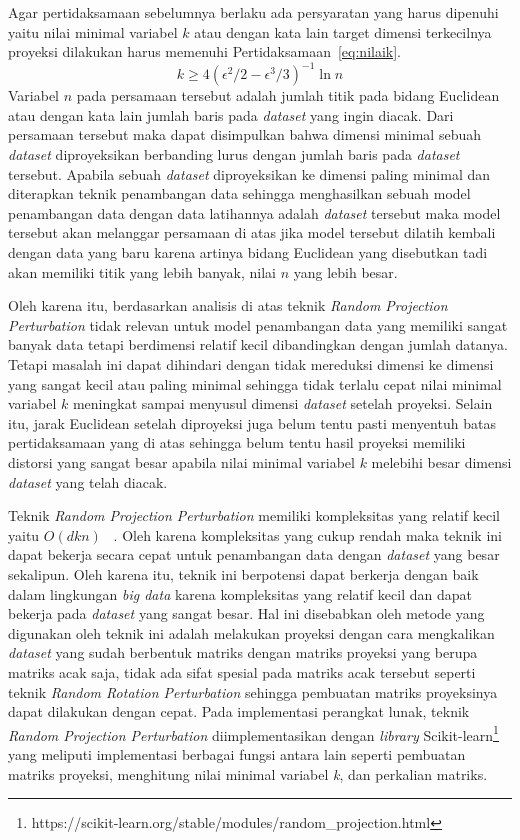Agar pertidaksamaan sebelumnya berlaku ada persyaratan yang harus dipenuhi yaitu nilai minimal variabel \(k\) atau dengan kata lain target dimensi terkecilnya proyeksi dilakukan harus memenuhi Pertidaksamaan~\ref{eq:nilaik}.
\begin{equation}\label{eq:nilaik}
	k \geq 4(\epsilon^{2}/2-\epsilon^{3}/3)^{-1}\ln{n}
\end{equation}
Variabel \(n\) pada persamaan tersebut adalah jumlah titik pada bidang Euclidean atau dengan kata lain jumlah baris pada \textit{dataset} yang ingin diacak. Dari persamaan tersebut maka dapat disimpulkan bahwa dimensi minimal sebuah \textit{dataset} diproyeksikan berbanding lurus dengan jumlah baris pada \textit{dataset} tersebut. Apabila sebuah \textit{dataset} diproyeksikan ke dimensi paling minimal dan diterapkan teknik penambangan data sehingga menghasilkan sebuah model penambangan data dengan data latihannya adalah \textit{dataset} tersebut maka model tersebut akan melanggar persamaan di atas jika model tersebut dilatih kembali dengan data yang baru karena artinya bidang Euclidean yang disebutkan tadi akan memiliki titik yang lebih banyak, nilai \(n\) yang lebih besar. 

Oleh karena itu, berdasarkan analisis di atas teknik \textit{Random Projection Perturbation} tidak relevan untuk model penambangan data yang memiliki sangat banyak data tetapi berdimensi relatif kecil dibandingkan dengan jumlah datanya. Tetapi masalah ini dapat dihindari dengan tidak mereduksi dimensi ke dimensi yang sangat kecil atau paling minimal sehingga tidak terlalu cepat nilai minimal variabel \(k\) meningkat sampai menyusul dimensi \textit{dataset} setelah proyeksi. Selain itu, jarak Euclidean setelah diproyeksi juga belum tentu pasti menyentuh batas pertidaksamaan yang di atas sehingga belum tentu hasil proyeksi memiliki distorsi yang sangat besar apabila nilai minimal variabel \(k\) melebihi besar dimensi \textit{dataset} yang telah diacak.

Teknik \textit{Random Projection Perturbation} memiliki kompleksitas yang relatif kecil yaitu \(O(dkn)\) ~\cite{bingham:01:projection}. Oleh karena kompleksitas yang cukup rendah maka teknik ini dapat bekerja secara cepat untuk penambangan data dengan \textit{dataset} yang besar sekalipun. Oleh karena itu, teknik ini berpotensi dapat berkerja dengan baik dalam lingkungan \textit{big data} karena kompleksitas yang relatif kecil dan dapat bekerja pada \textit{dataset} yang sangat besar. Hal ini disebabkan oleh metode yang digunakan oleh teknik ini adalah melakukan proyeksi dengan cara mengkalikan \textit{dataset} yang sudah berbentuk matriks dengan matriks proyeksi yang berupa matriks acak saja, tidak ada sifat spesial pada matriks acak tersebut seperti teknik \textit{Random Rotation Perturbation} sehingga pembuatan matriks proyeksinya dapat dilakukan dengan cepat. Pada implementasi perangkat lunak, teknik \textit{Random Projection Perturbation} diimplementasikan dengan \textit{library} Scikit-learn\footnote{https://scikit-learn.org/stable/modules/random\_projection.html} yang meliputi implementasi berbagai fungsi antara lain seperti pembuatan matriks proyeksi, menghitung nilai minimal variabel \textit{k}, dan perkalian matriks.

